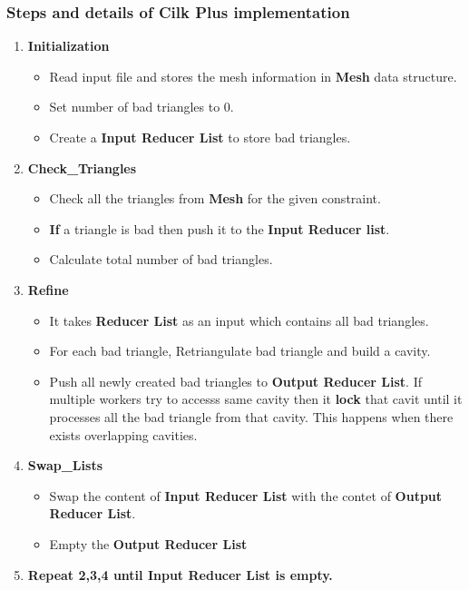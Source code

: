 \documentclass{article}
\begin{document}
\subsubsection{Steps and details of Cilk Plus implementation}
\begin{enumerate}

\item \textbf{Initialization}
\begin{itemize}
\item Read input file and stores the mesh information in \textbf{Mesh} data structure.
\item Set number of bad triangles to 0.
\item Create a \textbf{Input Reducer List} to store bad triangles.
\end{itemize}

\item \textbf{Check\_Triangles}
\begin{itemize}
\item Check all the triangles from \textbf{Mesh} for the given constraint.
\item \textbf{If} a triangle is bad then push it to the \textbf{Input Reducer list}.
\item Calculate total number of bad triangles.
\end{itemize}

\item \textbf{Refine}
\begin{itemize}
\item It takes \textbf{Reducer List} as an input which contains all bad triangles.
\item For each bad triangle, Retriangulate bad triangle and build a cavity. 
\item Push all newly created bad triangles to \textbf{Output Reducer List}. If multiple workers try to accesss same cavity then it \textbf{lock} that cavit until it processes all the bad triangle from that cavity. This happens when there exists overlapping cavities.
\end{itemize}

\item \textbf{Swap\_Lists}
\begin{itemize}
\item Swap the content of \textbf{Input Reducer List} with the contet of \textbf{Output Reducer List}.
\item Empty the \textbf{Output Reducer List}
\end{itemize}

\item \textbf{Repeat 2,3,4 until Input Reducer List is empty.}

\end{enumerate}
\end{document}
